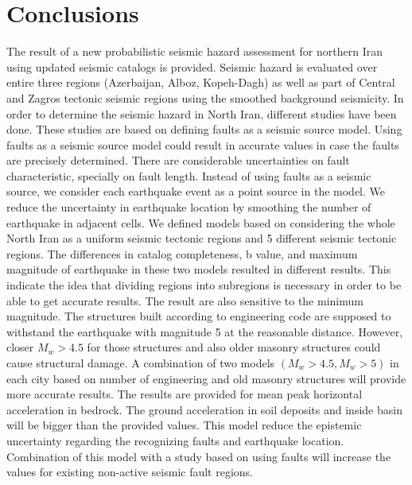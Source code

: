 \section{Conclusions}

The result of a new probabilistic seismic hazard assessment for northern Iran using updated seismic catalogs is provided. Seismic hazard is evaluated over entire three regions (Azerbaijan, Alboz, Kopeh-Dagh) as well as part of Central and Zagros tectonic seismic regions using the smoothed background seismicity. In order to determine the seismic hazard in North Iran, different studies have been done. These studies are based on defining faults as a seismic source model. Using faults as a seismic source model could result in accurate values in case the faults are precisely determined. There are considerable uncertainties on fault characteristic, specially on fault length. Instead of using faults as a seismic source, we consider each earthquake event as a point source in the model. We reduce the uncertainty in earthquake location by smoothing the number of earthquake in adjacent cells. We defined models based on considering the whole North Iran as a uniform seismic tectonic regions and 5 different seismic tectonic regions. The differences in catalog completeness, b value, and maximum magnitude of earthquake in these two models resulted in different results. This indicate the idea that dividing regions into subregions is necessary in order to be able to get accurate results. The result are also sensitive to the minimum magnitude. The structures built according to engineering code are supposed to withstand the earthquake with magnitude 5 at the reasonable distance. However, closer $M_w > 4.5$ for those structures and also older masonry structures could cause structural damage. A combination of two models $(M_w > 4.5, M_w>5)$ in each city based on number of engineering and old masonry structures will provide more accurate results. The results are provided for mean peak horizontal acceleration in bedrock. The ground acceleration in soil deposits and inside basin will be bigger than the provided values. This model reduce the epistemic uncertainty regarding the recognizing faults and earthquake location. Combination of this model with a study based on using faults will increase the values for existing non-active seismic fault regions.  

